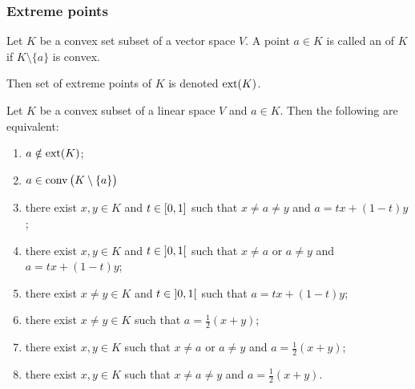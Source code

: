\subsubsection{Extreme points}
\begin{definition}
Let $K$ be a convex set subset of a vector space $V$. A point $a\in K$ is called an  of $K$ if $K\setminus \{a\}$ is convex.

Then set of extreme points of $K$ is denoted $\operatorname{ext}(K)$.
\end{definition}

\begin{lemma} \label{notExtremePointLemma}
Let $K$ be a convex subset of a linear space $V$ and $a\in K$. Then the following are equivalent:
\begin{enumerate}
\item $a\notin \operatorname{ext}(K)$;
\item $a\in \operatorname{conv}\big(K\setminus \{a\}\big)$
\item there exist $x,y\in K$ and $t\in \interval{0,1}$ such that $x\neq a\neq y$ and $a = tx+ (1-t)y$;
\item there exist $x,y\in K$ and $t\in \interval[o]{0,1}$ such that $x\neq a$ or $a\neq y$ and $a = tx+ (1-t)y$;
\item there exist $x\neq y\in K$ and $t\in \interval[o]{0,1}$ such that $a = tx+ (1-t)y$;
\item there exist $x\neq y\in K$ such that $a = \frac{1}{2}(x+ y)$;
\item there exist $x,y\in K$ such that $x\neq a$ or $a\neq y$ and $a = \frac{1}{2}(x+ y)$;
\item there exist $x,y\in K$ such that $x\neq a\neq y$ and $a = \frac{1}{2}(x+ y)$.
\end{enumerate}
\end{lemma}
